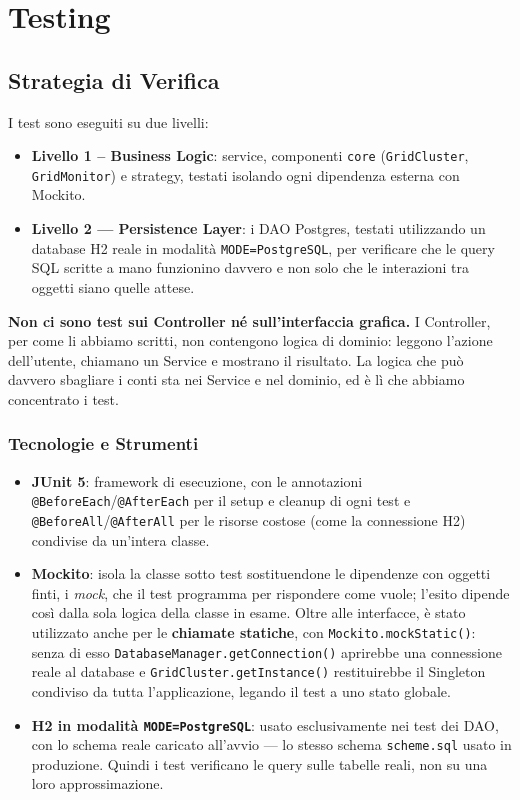 \chapter{Testing}
\label{ch:testing}

\section{Strategia di Verifica}

I test sono eseguiti su due livelli:

\begin{itemize}
    \item \textbf{Livello 1 -- Business Logic}: service, componenti \texttt{core} (\texttt{GridCluster}, \texttt{GridMonitor}) e strategy, testati isolando ogni dipendenza esterna con Mockito.
    \item \textbf{Livello 2 — Persistence Layer}: i DAO Postgres, testati utilizzando un database H2 reale in modalità \texttt{MODE=PostgreSQL}, per verificare che le query SQL scritte a mano funzionino davvero e non solo che le interazioni tra oggetti siano quelle attese.
\end{itemize}

\textbf{Non ci sono test sui Controller né sull'interfaccia grafica.} I Controller, per come li abbiamo scritti, non contengono logica di dominio: leggono l'azione dell'utente, chiamano un Service e mostrano il risultato. La logica che può davvero sbagliare i conti sta nei Service e nel dominio, ed è lì che abbiamo concentrato i test.

\subsection{Tecnologie e Strumenti}

\begin{itemize}
    \item \textbf{JUnit 5}: framework di esecuzione, con le annotazioni \texttt{@BeforeEach}/\texttt{@AfterEach} per il setup e cleanup di ogni test e \texttt{@BeforeAll}/\texttt{@AfterAll} per le risorse costose (come la connessione H2) condivise da un'intera classe.
    \item \textbf{Mockito}: isola la classe sotto test sostituendone le dipendenze con oggetti finti, i \textit{mock}, che il test programma per rispondere come vuole; l'esito dipende così dalla sola logica della classe in esame. Oltre alle interfacce, è stato utilizzato anche per le \textbf{chiamate statiche}, con \texttt{Mockito.mockStatic()}: senza di esso \texttt{DatabaseManager.getConnection()} aprirebbe una connessione reale al database e \texttt{GridCluster.getInstance()} restituirebbe il Singleton condiviso da tutta l'applicazione, legando il test a uno stato globale.
    \item \textbf{H2 in modalità \texttt{MODE=PostgreSQL}}: usato esclusivamente nei test dei DAO, con lo schema reale caricato all'avvio — lo stesso schema \texttt{scheme.sql} usato in produzione. Quindi i test verificano le query sulle tabelle reali, non su una loro approssimazione.
\end{itemize}


